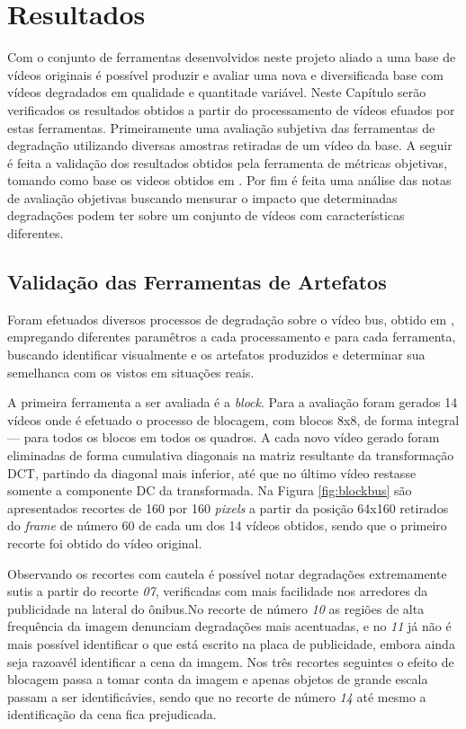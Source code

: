 
\chapter{Resultados} %

Com o conjunto de ferramentas desenvolvidos neste projeto aliado a uma base de vídeos originais é possível produzir e avaliar uma nova e diversificada base com vídeos degradados em qualidade e quantitade variável.
Neste Capítulo serão verificados os resultados obtidos a partir do processamento de vídeos efuados por estas ferramentas. Primeiramente uma avaliação subjetiva das ferramentas de degradação utilizando diversas amostras retiradas de um vídeo da base. A seguir é feita a validação dos resultados obtidos pela ferramenta de métricas objetivas, tomando como base os videos obtidos em \cite{videolab}.
Por fim é feita uma análise das notas de avaliação objetivas buscando mensurar o impacto que determinadas degradações podem ter sobre um conjunto de vídeos com características diferentes.

\section{Validação das Ferramentas de Artefatos}

Foram efetuados diversos processos de degradação sobre o vídeo bus, obtido em \cite{tracevideoseq},  empregando diferentes paramêtros a cada processamento e para cada ferramenta, buscando identificar visualmente e os artefatos produzidos e determinar sua semelhanca com os vistos em situações reais.

A primeira ferramenta a ser avaliada é a \emph{block}.
Para a avaliação foram gerados 14 vídeos onde é efetuado o processo de blocagem, com blocos 8x8, de forma integral --- para todos os blocos em todos os quadros. A cada novo vídeo gerado foram eliminadas de forma cumulativa diagonais na matriz resultante da transformação DCT, partindo da diagonal mais inferior, até que no último vídeo restasse somente a componente DC da transformada. 
Na Figura \ref{fig:blockbus} são apresentados recortes de 160 por 160 \emph{pixels} a partir da posição 64x160 retirados do \emph{frame} de número 60 de cada um dos 14 vídeos obtidos, sendo que o primeiro recorte foi obtido do vídeo original.

Observando os recortes com cautela é possível notar degradações extremamente sutis a partir do recorte \emph{07}, verificadas com mais facilidade nos arredores da publicidade na lateral do ônibus.No recorte de número \emph{10} as regiões de alta frequência da imagem denunciam degradações mais acentuadas, e no \emph{11} já não é mais possível identificar o que está escrito na placa de publicidade, embora ainda seja razoavél identificar a cena da imagem.
Nos três recortes seguintes o efeito de blocagem passa a tomar conta da imagem e apenas objetos de grande escala passam a ser identificávies, sendo que no recorte de número \emph{14} até mesmo a identificação da cena fica prejudicada.

